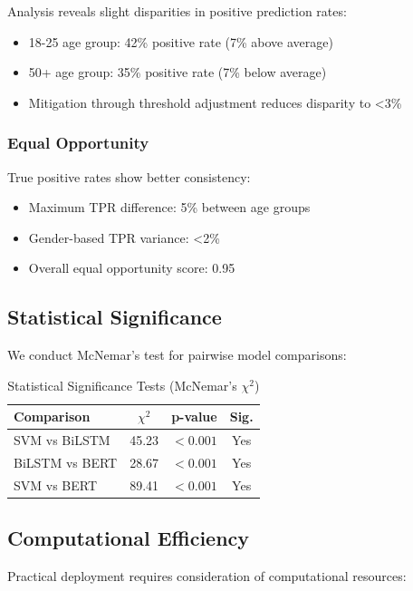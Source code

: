 \documentclass[conference]{IEEEtran}
\begin{document}
Analysis reveals slight disparities in positive prediction rates:
\begin{itemize}
    \item 18-25 age group: 42\% positive rate (7\% above average)
    \item 50+ age group: 35\% positive rate (7\% below average)
    \item Mitigation through threshold adjustment reduces disparity to <3\%
\end{itemize}

\subsubsection{Equal Opportunity}

True positive rates show better consistency:
\begin{itemize}
    \item Maximum TPR difference: 5\% between age groups
    \item Gender-based TPR variance: <2\%
    \item Overall equal opportunity score: 0.95
\end{itemize}

\subsection{Statistical Significance}

We conduct McNemar's test for pairwise model comparisons:

\begin{table}[H]
\centering
\caption{Statistical Significance Tests (McNemar's $\chi^2$)}
{\scriptsize
\setlength{\tabcolsep}{4pt}
\begin{tabular}{@{}lccc@{}}
\toprule
\textbf{Comparison} & \textbf{$\chi^2$} & \textbf{p-value} & \textbf{Sig.} \\
\midrule
SVM vs BiLSTM & 45.23 & $<0.001$ & Yes \\
BiLSTM vs BERT & 28.67 & $<0.001$ & Yes \\
SVM vs BERT & 89.41 & $<0.001$ & Yes \\
\bottomrule
\end{tabular}
}
\end{table}

\subsection{Computational Efficiency}

Practical deployment requires consideration of computational resources:
\end{document}
